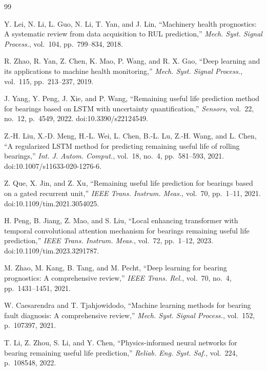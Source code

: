\documentclass[5p,twocolumn]{elsarticle}
\begin{document}
\begin{thebibliography}{99}

Y. Lei, N. Li, L. Guo, N. Li, T. Yan, and J. Lin,
``Machinery health prognostics: A systematic review from data acquisition to RUL prediction,''
\textit{Mech. Syst. Signal Process.}, vol.~104, pp.~799--834, 2018.

R. Zhao, R. Yan, Z. Chen, K. Mao, P. Wang, and R. X. Gao,
``Deep learning and its applications to machine health monitoring,''
\textit{Mech. Syst. Signal Process.}, vol.~115, pp.~213--237, 2019.

J. Yang, Y. Peng, J. Xie, and P. Wang,
``Remaining useful life prediction method for bearings based on LSTM with uncertainty quantification,''
\textit{Sensors}, vol.~22, no.~12, p.~4549, 2022. doi:10.3390/s22124549.

Z.-H. Liu, X.-D. Meng, H.-L. Wei, L. Chen, B.-L. Lu, Z.-H. Wang, and L. Chen,
``A regularized LSTM method for predicting remaining useful life of rolling bearings,''
\textit{Int. J. Autom. Comput.}, vol.~18, no.~4, pp.~581--593, 2021. doi:10.1007/s11633-020-1276-6.

Z. Que, X. Jin, and Z. Xu,
``Remaining useful life prediction for bearings based on a gated recurrent unit,''
\textit{IEEE Trans. Instrum. Meas.}, vol.~70, pp.~1--11, 2021. doi:10.1109/tim.2021.3054025.

H. Peng, B. Jiang, Z. Mao, and S. Liu,
``Local enhancing transformer with temporal convolutional attention mechanism for bearings remaining useful life prediction,''
\textit{IEEE Trans. Instrum. Meas.}, vol.~72, pp.~1--12, 2023. doi:10.1109/tim.2023.3291787.

M. Zhao, M. Kang, B. Tang, and M. Pecht,
``Deep learning for bearing prognostics: A comprehensive review,''
\textit{IEEE Trans. Rel.}, vol.~70, no.~4, pp.~1431--1451, 2021.

W. Caesarendra and T. Tjahjowidodo,
``Machine learning methods for bearing fault diagnosis: A comprehensive review,''
\textit{Mech. Syst. Signal Process.}, vol.~152, p.~107397, 2021.

T. Li, Z. Zhou, S. Li, and Y. Chen,
``Physics-informed neural networks for bearing remaining useful life prediction,''
\textit{Reliab. Eng. Syst. Saf.}, vol.~224, p.~108548, 2022.


\end{thebibliography}
\end{document}
